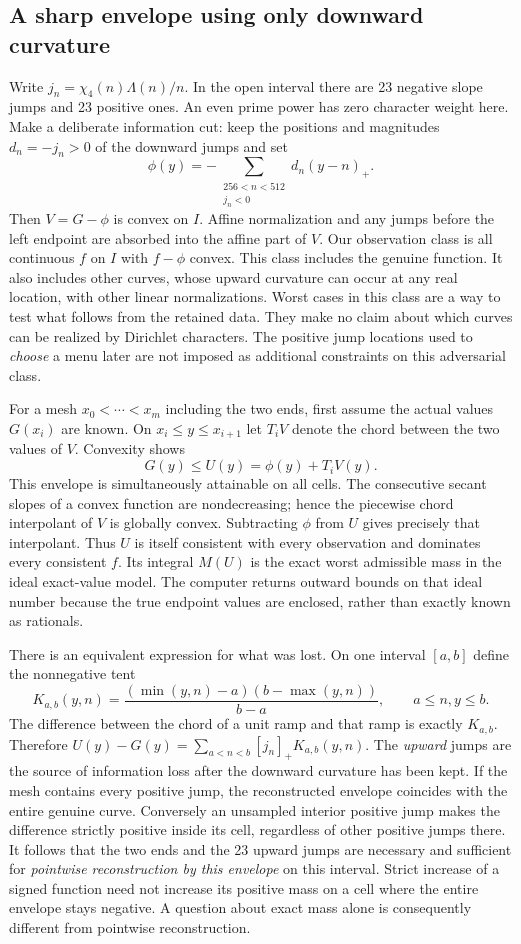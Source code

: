 \documentclass[12pt,letterpaper]{article}
\begin{document}
\subsection{A sharp envelope using only downward curvature}
Write \(j_n=\chi_4(n)\Lambda(n)/n\). In the open interval there are 23 negative slope jumps and 23 positive ones. An even prime power has zero character weight here. Make a deliberate information cut: keep the positions and magnitudes \(d_n=-j_n>0\) of the downward jumps and set
\[
 \phi(y)=-\sum_{\substack{256<n<512\\ j_n<0}}d_n(y-n)_+.
\]
Then \(V=G-\phi\) is convex on \(I\). Affine normalization and any jumps before the left endpoint are absorbed into the affine part of \(V\). Our observation class is all continuous \(f\) on \(I\) with \(f-\phi\) convex. This class includes the genuine function. It also includes other curves, whose upward curvature can occur at any real location, with other linear normalizations. Worst cases in this class are a way to test what follows from the retained data. They make no claim about which curves can be realized by Dirichlet characters. The positive jump locations used to \emph{choose} a menu later are not imposed as additional constraints on this adversarial class.

For a mesh \(x_0<\cdots<x_m\) including the two ends, first assume the actual values \(G(x_i)\) are known. On \(x_i\le y\le x_{i+1}\) let \(T_i V\) denote the chord between the two values of \(V\). Convexity shows
\[
                     G(y)\le U(y)=\phi(y)+T_i V(y).
\]
This envelope is simultaneously attainable on all cells. The consecutive secant slopes of a convex function are nondecreasing; hence the piecewise chord interpolant of \(V\) is globally convex. Subtracting \(\phi\) from \(U\) gives precisely that interpolant. Thus \(U\) is itself consistent with every observation and dominates every consistent \(f\). Its integral \(M(U)\) is the exact worst admissible mass in the ideal exact-value model. The computer returns outward bounds on that ideal number because the true endpoint values are enclosed, rather than exactly known as rationals.

There is an equivalent expression for what was lost. On one interval \([a,b]\) define the nonnegative tent
\[
 K_{a,b}(y,n)=\frac{(\min(y,n)-a)(b-\max(y,n))}{b-a},
 \qquad a\le n,y\le b .
\]
The difference between the chord of a unit ramp and that ramp is exactly \(K_{a,b}\). Therefore \(U(y)-G(y)=\sum_{a<n<b}[j_n]_+K_{a,b}(y,n)\). The \emph{upward} jumps are the source of information loss after the downward curvature has been kept. If the mesh contains every positive jump, the reconstructed envelope coincides with the entire genuine curve. Conversely an unsampled interior positive jump makes the difference strictly positive inside its cell, regardless of other positive jumps there. It follows that the two ends and the 23 upward jumps are necessary and sufficient for \emph{pointwise reconstruction by this envelope} on this interval. Strict increase of a signed function need not increase its positive mass on a cell where the entire envelope stays negative. A question about exact mass alone is consequently different from pointwise reconstruction.
\end{document}
